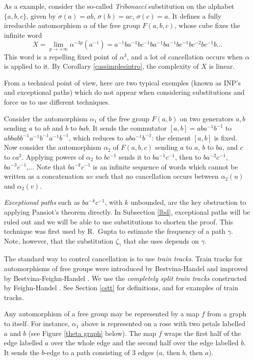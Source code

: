 \documentclass[11pt]{amsart}
\theoremstyle{remark}
\newcommand{\m} {^{-1}}
\begin{document}
As a example, 
consider the so-called {\em Tribonacci} substitution on the alphabet $\{a,b,c\}$, given by $\sigma(a)=ab$, $\sigma(b)=ac$, $\sigma(c)=a$. It defines a fully irreducible automorphism $\alpha$ of the free group $F(a,b,c)$,  whose cube fixes the infinite word $$X=\lim_{p\to+ \infty} \alpha^{-3p}(a\m)=a^{-1}ba^{-1}bc^{-1}b a^{-1}ba^{-1}bc^{-1}b c^{-2}bc^{-1}b\dots$$ 
This word is a repelling fixed point of  $\alpha^3$, and a lot of cancellation occurs when $\alpha$ is applied to it.
By Corollary \ref{cassimplesintro}, the complexity of $X$ is linear.


 
 From a technical point of view, here are two typical exemples (known as INP's and exceptional paths) which do not appear when considering substitutions    and force us to use different techniques. 
 
 Consider the automorphism  $\alpha_1$ of the free group $F(a,b)$ on two generators $a,b$ sending $a$ to $ab$ and $b$ to $bab$. It sends the commutator $[a,b]=aba\m b\m$ to $abbab b\m a\m b\m a\m b\m$, which reduces to $aba\m b\m$: the element $[a,b]$ is fixed. 
 Now consider the automorphism $\alpha_2$ of $F(a,b,c)$ sending $a$ to $a$, $b$ to $ba$, and $c$
 to $ca^2$. Applying powers of $\alpha_2$ to  $bc\m$  sends it to $ba\m c\m$, then to $ba^{-2} c\m$, $ba^{-3} c\m$,...  Note that $ba^{-k}c\m$ is an infinite sequence of words which cannot be written as a concatenation $uv$ such that no cancellation occurs between $\alpha_2(u)$ and $\alpha_2(v)$.
 
   \emph{Exceptional paths} such as $ba^{-k}c\m$, with $k$ unbounded,  are the key obstruction to applying Pansiot's theorem directly. In Subsection \ref{lbd}, exceptional paths will be ruled out and we will be able to use substitutions to shorten the    proof. This technique was first used by R.\ Gupta \cite{Gup} to estimate the frequency of a path $\gamma$. Note, however, that the substitution $\zeta_\gamma$ that she uses depends on  $\gamma$.
 
 The standard way to control cancellation is to use \emph{train tracks}.  
 Train tracks for automorphisms of free groups were introduced by Bestvina-Handel \cite{BHtrain} and improved by Bestvina-Feighn-Handel \cite{Tits1}. We use the \emph{completely split train tracks} constructed by Feighn-Handel \cite{recogn}. See Section \ref{cstt} for definitions, and \cite{Bogop} for examples of train tracks.
 
 
 
 
 Any automorphism of a free group may be represented by a map $f$ from a graph   to itself. For instance, $\alpha_1$ above is represented on a rose with two petals labelled $a$ and $b$ (see Figure \ref{theta graph} below). The map $f$ wraps the first half of the edge labelled $a$ over   the whole edge and the second half over the edge labelled $b$. It sends the $b$-edge to a path consisting of 3 edges ($a$, then $b$, then $a$).
\end{document}
